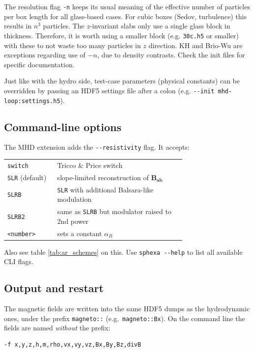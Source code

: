 The resolution flag \texttt{-n} keeps its usual meaning of the effective number of particles per box length for all glass-based cases. For cubic boxes (Sedov, turbulence) this results in $n^3$ particles. The $z$-invariant slabs only use a single glass block in thickness. Therefore, it is worth using a smaller block (e.g. \texttt{30c.h5} or smaller) with these to not waste too many particles in $z$ direction. KH and Brio-Wu are exceptions regarding use of $-n$, due to density contrasts. Check the init files for specific documentation.

Just like with the hydro side, test-case parameters (physical constants) can be overridden by passing an HDF5 settings file after a colon (e.g. \texttt{-{}-init mhd-loop:settings.h5}).

\subsection{Command-line options}
The MHD extension adds the \texttt{-{}-resistivity} flag. It accepts:

\begin{center}
\begin{tabular}{@{}l p{0.72\linewidth}@{}}
\texttt{switch} & Tricco \& Price switch\\
\texttt{SLR} (default) & slope-limited reconstruction of $\mathbf{B_{ab}}$\\
\texttt{SLRB}  & \texttt{SLR} with additional Balsara-like modulation \\
\texttt{SLRB2} & same as \texttt{SLRB} but modulator raised to 2nd power \\
\texttt{\textless number\textgreater} & sets a constant $\alpha_B$ \\
\end{tabular}
\end{center}

Also see table \ref{tab:ar_schemes} on this. Use \texttt{sphexa -{}-help} to list all available CLI flags.

\subsection{Output and restart}

The magnetic fields are written into the same HDF5 dumps as the hydrodynamic ones, under
the prefix \texttt{magneto::} (e.g.\ \texttt{magneto::Bx}). On the command line the fields
are named \emph{without} the prefix:

\begin{verbatim}
-f x,y,z,h,m,rho,vx,vy,vz,Bx,By,Bz,divB
\end{verbatim}

